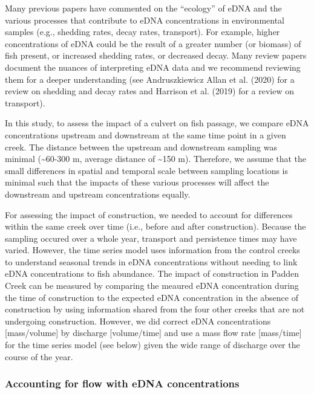 \documentclass[
]{article}
\begin{document}
Many previous papers have commented on the ``ecology'' of eDNA and the
various processes that contribute to eDNA concentrations in
environmental samples (e.g., shedding rates, decay rates, transport).
For example, higher concentrations of eDNA could be the result of a
greater number (or biomass) of fish present, or increased shedding
rates, or decreased decay. Many review papers document the nuances of
interpreting eDNA data and we recommend reviewing them for a deeper
understanding (see Andruszkiewicz Allan et al. (2020) for a review on
shedding and decay rates and Harrison et al. (2019) for a review on
transport).

In this study, to assess the impact of a culvert on fish passage, we
compare eDNA concentrations upstream and downstream at the same time
point in a given creek. The distance between the upstream and downstream
sampling was minimal (\textasciitilde60-300 m, average distance of
\textasciitilde150 m). Therefore, we assume that the small differences
in spatial and temporal scale between sampling locations is minimal such
that the impacts of these various processes will affect the downstream
and upstream concentrations equally.

For assessing the impact of construction, we needed to account for
differences within the same creek over time (i.e., before and after
construction). Because the sampling occured over a whole year, transport
and persistence times may have varied. However, the time series model
uses information from the control creeks to understand seasonal trends
in eDNA concentrations without needing to link eDNA concentrations to
fish abundance. The impact of construction in Padden Creek can be
measured by comparing the meaured eDNA concentration during the time of
construction to the expected eDNA concentration in the absence of
construction by using information shared from the four other creeks that
are not undergoing construction. However, we did correct eDNA
concentrations {[}mass/volume{]} by discharge {[}volume/time{]} and use
a mass flow rate {[}mass/time{]} for the time series model (see below)
given the wide range of discharge over the course of the year.

\hypertarget{accounting-for-flow-with-edna-concentrations}{%
\subsubsection{Accounting for flow with eDNA
concentrations}\label{accounting-for-flow-with-edna-concentrations}}
\end{document}
